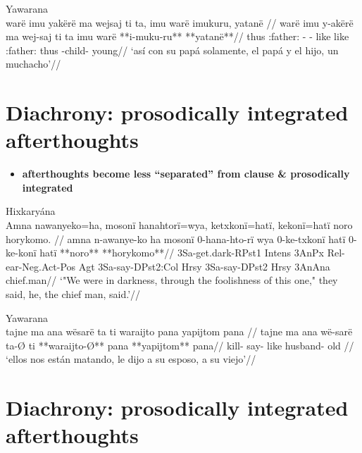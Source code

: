 \documentclass[10pt]{article}
\begin{document}
\ex Yawarana \parencite{caceres2020flex} \\
\label{ctowaru-19}    \begingl
    \glpreamble warë imu yakërë ma wejsaj ti ta, imu warë imukuru, yatanë //
    \gla warë imu y-akërë ma wej-saj ti ta imu warë **i-muku-ru** **yatanë**//
    \glb thus :father: -  - like like :father: thus -child- young//
        \glft ‘así con su papá solamente, el papá y el hijo, un muchacho’//  
    \endgl 
\xe

\section{Diachrony: prosodically integrated afterthoughts}

\begin{itemize}
\tightlist
\item
  \textbf{afterthoughts become less ``separated'' from clause \&
  prosodically integrated}
\end{itemize}

\ex Hixkaryána \parencite[19]{derbyshire1965textos} \\
\label{derbyshire-1965-p-019-the-origin-of-night-and-darkness-081}    \begingl
    \glpreamble Amna nawanyeko=ha, mosonï hanahtorï=wya, ketxkonï=hatï, kekonï=hatï noro horykomo. //
    \gla amna n-awanye-ko ha mosonï 0-hana-hto-rï wya 0-ke-txkonï hatï 0-ke-konï hatï **noro** **horykomo**//
    \glb {} 3Sa-get.dark-RPst1 Intens 3AnPx Rel-ear-Neg.Act-Pos Agt 3Sa-say-DPst2:Col Hrsy 3Sa-say-DPst2 Hrsy 3AnAna chief.man//
        \glft ‘"We were in darkness, through the foolishness of this one," they said, he, the chief man, said.’//  
    \endgl 
\xe

\ex Yawarana \parencite{caceres2020flex} \\
\label{ctowaru-36}    \begingl
    \glpreamble tajne ma ana wësarë ta ti waraijto pana yapijtom pana //
    \gla tajne ma ana wë-sarë ta-Ø ti **waraijto-Ø** pana **yapijtom** pana//
    \glb {}   kill- say- like husband-  old //
        \glft ‘ellos nos están matando, le dijo a su esposo, a su viejo’//  
    \endgl 
\xe

\section{Diachrony: prosodically integrated afterthoughts}
\end{document}
